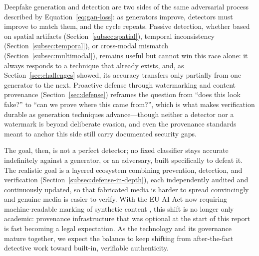 \documentclass[a4paper,12pt]{article}
\begin{document}
Deepfake generation and detection are two sides of the same adversarial process described by Equation~\ref{eq:gan-loss}: as generators improve, detectors must improve to match them, and the cycle repeats. Passive detection, whether based on spatial artifacts (Section~\ref{subsec:spatial}), temporal inconsistency (Section~\ref{subsec:temporal}), or cross-modal mismatch (Section~\ref{subsec:multimodal}), remains useful but cannot win this race alone: it always responds to a technique that already exists, and, as Section~\ref{sec:challenges} showed, its accuracy transfers only partially from one generator to the next. Proactive defense through watermarking and content provenance (Section~\ref{sec:defense}) reframes the question from ``does this look fake?'' to ``can we prove where this came from?'', which is what makes verification durable as generation techniques advance---though neither a detector nor a watermark is beyond deliberate evasion, and even the provenance standards meant to anchor this side still carry documented security gaps.

The goal, then, is not a perfect detector; no fixed classifier stays accurate indefinitely against a generator, or an adversary, built specifically to defeat it. The realistic goal is a layered ecosystem combining prevention, detection, and verification (Section~\ref{subsec:defense-in-depth}), each independently audited and continuously updated, so that fabricated media is harder to spread convincingly and genuine media is easier to verify. With the EU AI Act now requiring machine-readable marking of synthetic content \cite{euaiact2024}, this shift is no longer only academic: provenance infrastructure that was optional at the start of this report is fast becoming a legal expectation. As the technology and its governance mature together, we expect the balance to keep shifting from after-the-fact detective work toward built-in, verifiable authenticity.
\newpage



\end{document}
